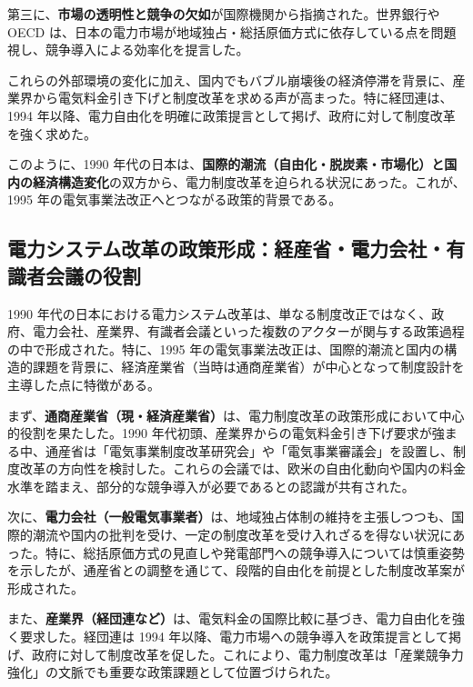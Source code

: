 第三に、\textbf{市場の透明性と競争の欠如}が国際機関から指摘された。世界銀行や OECD は、日本の電力市場が地域独占・総括原価方式に依存している点を問題視し、競争導入による効率化を提言した\parencite{WorldBank1993PowerSector}。

これらの外部環境の変化に加え、国内でもバブル崩壊後の経済停滞を背景に、産業界から電気料金引き下げと制度改革を求める声が高まった。特に経団連は、1994 年以降、電力自由化を明確に政策提言として掲げ、政府に対して制度改革を強く求めた\parencite{Keidanren1994Proposal}。

このように、1990 年代の日本は、\textbf{国際的潮流（自由化・脱炭素・市場化）と国内の経済構造変化}の双方から、電力制度改革を迫られる状況にあった。これが、1995 年の電気事業法改正へとつながる政策的背景である。

\subsection{電力システム改革の政策形成：経産省・電力会社・有識者会議の役割}

1990 年代の日本における電力システム改革は、単なる制度改正ではなく、政府、電力会社、産業界、有識者会議といった複数のアクターが関与する政策過程の中で形成された。特に、1995 年の電気事業法改正は、国際的潮流と国内の構造的課題を背景に、経済産業省（当時は通商産業省）が中心となって制度設計を主導した点に特徴がある。

まず、\textbf{通商産業省（現・経済産業省）}は、電力制度改革の政策形成において中心的役割を果たした。1990 年代初頭、産業界からの電気料金引き下げ要求が強まる中、通産省は「電気事業制度改革研究会」や「電気事業審議会」を設置し、制度改革の方向性を検討した。これらの会議では、欧米の自由化動向や国内の料金水準を踏まえ、部分的な競争導入が必要であるとの認識が共有された\parencite{METI1994Council}。

次に、\textbf{電力会社（一般電気事業者）}は、地域独占体制の維持を主張しつつも、国際的潮流や国内の批判を受け、一定の制度改革を受け入れざるを得ない状況にあった。特に、総括原価方式の見直しや発電部門への競争導入については慎重姿勢を示したが、通産省との調整を通じて、段階的自由化を前提とした制度改革案が形成された\parencite{Denjiren1995Position}。

また、\textbf{産業界（経団連など）}は、電気料金の国際比較に基づき、電力自由化を強く要求した。経団連は 1994 年以降、電力市場への競争導入を政策提言として掲げ、政府に対して制度改革を促した。これにより、電力制度改革は「産業競争力強化」の文脈でも重要な政策課題として位置づけられた\parencite{Keidanren1994Proposal}。

